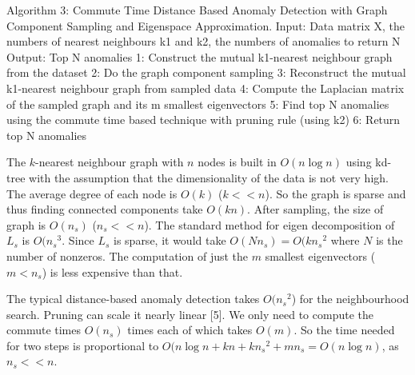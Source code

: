 Algorithm 3: Commute Time Distance Based Anomaly Detection with Graph
Component Sampling and Eigenspace Approximation.
Input: Data matrix X, the numbers of nearest neighbours k1 and k2, the numbers
of anomalies to return N
Output: Top N anomalies
1: Construct the mutual k1-nearest neighbour graph from the dataset
2: Do the graph component sampling
3: Reconstruct the mutual k1-nearest neighbour graph from sampled data
4: Compute the Laplacian matrix of the sampled graph and its m smallest
eigenvectors
5: Find top N anomalies using the commute time based technique with pruning rule
(using k2)
6: Return top N anomalies

The $k$-nearest neighbour graph with $n$ nodes is built in $O(n \log n)$ using kd-tree with the assumption that the dimensionality of the data is not very high. The average degree of each node is $O(k)$ ($k << n$). So the graph is sparse and thus finding connected components take $O(kn)$. After sampling, the size of graph is $O(n_s)$ ($n_s << n$). The standard method for eigen decomposition of $L_s$ is $O({n_s}^3$. Since $L_s$ is sparse, it would take $O(Nn_s) = O(k{n_s}^2$ where $N$ is the number of nonzeros. The computation of just the $m$ smallest eigenvectors ($m < n_s$) is less expensive than that.

The typical distance-based anomaly detection takes $O({n_s}^2$) for the neighbourhood search. Pruning can scale it nearly linear [5]. We only need to compute the commute times $O(n_s)$ times each of which takes $O(m)$. So the time needed for two steps is proportional to $O(n \log n + kn + k{n_s}^2 + mn_s = O(n \log n)$, as $n_s << n$.
